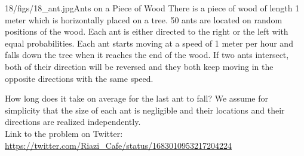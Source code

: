 \begin{problem}{18/figs/18_ant.jpg}{Ants on a Piece of Wood} There is a piece of wood of length 1 meter which is horizontally placed on a tree. 50 ants are located on random positions of the wood. Each ant is either directed to the right or the left with equal probabilities. Each ant starts moving at a speed of 1 meter per hour and falls down the tree when it reaches the end of the wood. If two ants intersect, both of their direction will be reversed and they both keep moving in the opposite directions with the same speed.

How long does it take on average for the last ant to fall? We assume for simplicity that the size of each ant is negligible and their locations and their directions are realized independently. \\[0.2cm]

Link to the problem on Twitter: \url{https://twitter.com/Riazi_Cafe/status/1683010953217204224}\end{problem}